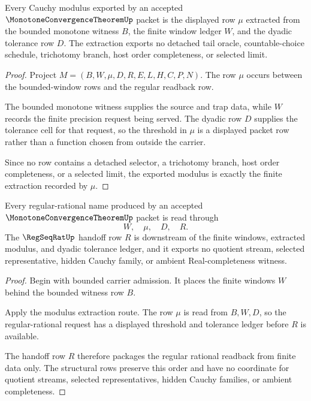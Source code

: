 \begin{theorem}
\label{thm:monotone-convergence-theorem-cauchy-modulus-extraction}
Every Cauchy modulus exported by an accepted $\MonotoneConvergenceTheoremUp$ packet is the displayed row $\mu$ extracted from the bounded monotone witness $B$, the finite window ledger $W$, and the dyadic tolerance row $D$. The extraction exports no detached tail oracle, countable-choice schedule, trichotomy branch, host order completeness, or selected limit.
\end{theorem}
\begin{proof}
Project $M=(B,W,\mu,D,R,E,L,H,C,P,N)$. The row $\mu$ occurs between the bounded-window rows and the regular readback row.

The bounded monotone witness supplies the source and trap data, while $W$ records the finite precision request being served. The dyadic row $D$ supplies the tolerance cell for that request, so the threshold in $\mu$ is a displayed packet row rather than a function chosen from outside the carrier.

Since no row contains a detached selector, a trichotomy branch, host order completeness, or a selected limit, the exported modulus is exactly the finite extraction recorded by $\mu$.
\end{proof}

\begin{theorem}
\label{thm:monotone-convergence-theorem-regseqrat-handoff}
Every regular-rational name produced by an accepted $\MonotoneConvergenceTheoremUp$ packet is read through
$$
W,\quad \mu,\quad D,\quad R .
$$
The $\RegSeqRatUp$ handoff row $R$ is downstream of the finite windows, extracted modulus, and dyadic tolerance ledger, and it exports no quotient stream, selected representative, hidden Cauchy family, or ambient Real-completeness witness.
\end{theorem}
\begin{proof}
Begin with bounded carrier admission. It places the finite windows $W$ behind the bounded witness row $B$.

Apply the modulus extraction route. The row $\mu$ is read from $B,W,D$, so the regular-rational request has a displayed threshold and tolerance ledger before $R$ is available.

The handoff row $R$ therefore packages the regular rational readback from finite data only. The structural rows preserve this order and have no coordinate for quotient streams, selected representatives, hidden Cauchy families, or ambient completeness.
\end{proof}

